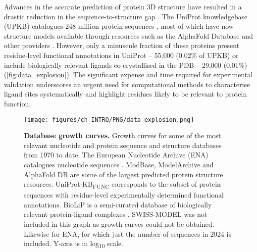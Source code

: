 Advances in the accurate prediction of protein 3D structure have resulted in a drastic reduction in the sequence-to-structure gap \cite{ABRAMSON_2024_ALPHAFOLD3}. The UniProt knowledgebase (UPKB) catalogues 248 million protein sequences \cite{UNIPROT_2018_UNIPROT, UNIPROT_2023_UNIPROT}, most of which have now structure models available through resources such as the AlphaFold Database \cite{VARADI_2022_ALPHAFOLDDB} and other providers \cite{GUEX_2009_SWISSMODEL, BEIENERT_2016_SWISSMODEL, WATERHOUSE_2018_SWISSMODEL}. However, only a minuscule fraction of these proteins present residue-level functional annotations in UniProt -- 55,000 (0.02\% of UPKB) or include biologically relevant ligands co-crystallised in the PDB \cite{wwPDB_2019_PDB} -- 29,000 (0.01\%) (\autoref{fig:data_explosion}). The significant expense and time required for experimental validation underscores an urgent need for computational methods to characterise ligand sites systematically and highlight residues likely to be relevant to protein function.

\begin{figure}[htb!]
    \centering
    \texttt{[image: figures/ch\_INTRO/PNG/data\_explosion.png]}
    \caption[Database growth curves]{\textbf{Database growth curves.}  Growth curves for some of the most relevant nucleotide and protein sequence and structure databases from 1970 to date. The European Nucleotide Archive (ENA) catalogues nucleotide sequences \cite{LEINONEN_2010_ENA}. ModBase, ModelArchive and AlphaFold DB are some of the largest predicted protein structure resources. UniProt-KB\textsubscript{FUNC} corresponds to the subset of protein sequences with residue-level experimentally determined functional annotations. BioLiP is a semi-curated database of biologically relevant protein-ligand complexes \cite{YANG_2013_BIOLIP}. SWISS-MODEL was not included in this graph as growth curves could not be obtained. Likewise for ENA, for which just the number of sequences in 2024 is included. Y-axis is in log\textsubscript{10} scale.}
    \label{fig:data_explosion}
\end{figure}

\newpage

